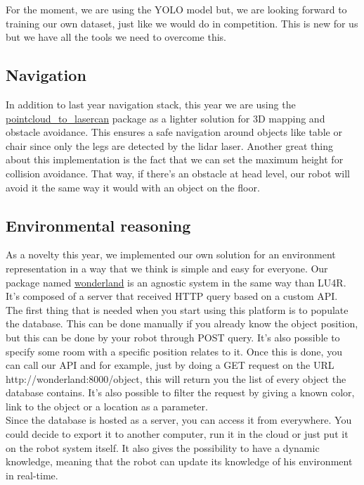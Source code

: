 \documentclass[runningheads,a4paper]{llncs}
\begin{document}
For the moment, we are using the YOLO model but, we are looking forward to training our own dataset, just like we would do in competition. This is new for us but we have all the tools we need to overcome this. \\

\subsection{Navigation}
\tab In addition to last year navigation stack, this year we are using the \href{http://wiki.ros.org/pointcloud_to_laserscan}{pointcloud\_to\_lasercan} package as a lighter solution for 3D mapping and obstacle avoidance. This ensures a safe navigation around objects like table or chair since only the legs are detected by the lidar laser. Another great thing about this implementation is the fact that we can set the maximum height for collision avoidance. That way, if there’s an obstacle at head level, our robot will avoid it the same way it would with an object on the floor. \\

\subsection{Environmental reasoning}
\tab As a novelty this year, we implemented our own solution for an environment representation in a way that we think is simple and easy for everyone. Our package named \href{http://github.com/walkingmachine/wonderland}{wonderland} is an agnostic system in the same way than LU4R. It’s composed of a server that received HTTP query based on a custom API. \\

The first thing that is needed when you start using this platform is to populate the database. This can be done manually if you already know the object position, but this can be done by your robot through POST query. It’s also possible to specify some room with a specific position relates to it. Once this is done, you can call our API and for example, just by doing a GET request on the URL http://wonderland:8000/object, this will return you the list of every object the database contains. It’s also possible to filter the request by giving a known color, link to the object or a location as a parameter. \\

Since the database is hosted as a server, you can access it from everywhere. You could decide to export it to another computer, run it in the cloud or just put it on the robot system itself. It also gives the possibility to have a dynamic knowledge, meaning that the robot can update its knowledge of his environment in real-time. \\
\end{document}
